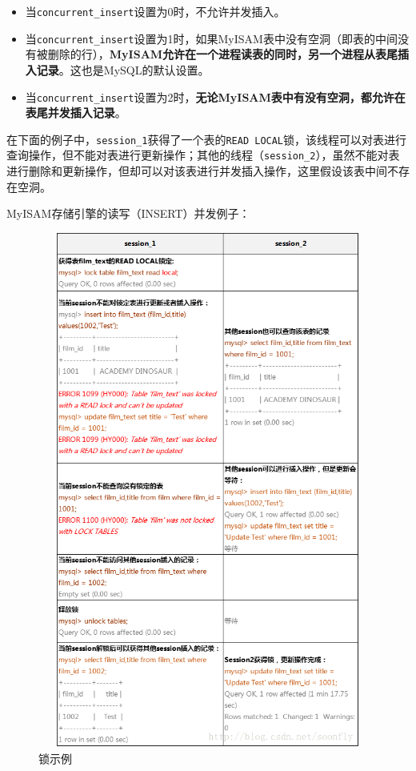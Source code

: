 \documentclass[UTF8,a4paper,12pt]{ctexbook}
\begin{document}
			\begin{itemize}
				\item 当\verb|concurrent_insert|设置为0时，不允许并发插入。
				\item 当\verb|concurrent_insert|设置为1时，如果MyISAM表中没有空洞（即表的中间没有被删除的行），\textbf{MyISAM允许在一个进程读表的同时，另一个进程从表尾插入记录}。这也是MySQL的默认设置。
				\item 当\verb|concurrent_insert|设置为2时，\textbf{无论MyISAM表中有没有空洞，都允许在表尾并发插入记录}。
			\end{itemize}
			
			在下面的例子中，\verb|session_1|获得了一个表的\verb|READ LOCAL|锁，该线程可以对表进行查询操作，但不能对表进行更新操作；其他的线程（\verb|session_2|），虽然不能对表进行删除和更新操作，但却可以对该表进行并发插入操作，这里假设该表中间不存在空洞。
			
			MyISAM存储引擎的读写（INSERT）并发例子：
			\begin{figure}[H]
				\centering
				\includegraphics[width=13cm, height=17cm]{lock2}
				\caption{锁示例}
			\end{figure}		
			
\end{document}
